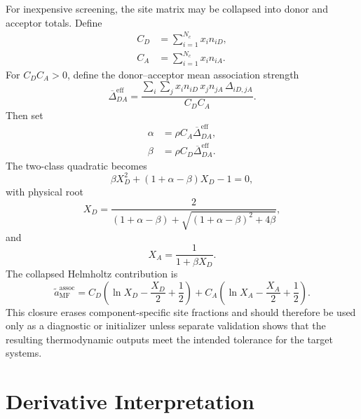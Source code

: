 \documentclass[12pt,letterpaper]{article}
\newcommand{\assoc}{\mathrm{assoc}}
\newcommand{\eff}{\mathrm{eff}}
\begin{document}
For inexpensive screening, the site matrix may be collapsed into donor and
acceptor totals. Define
\begin{align}
  C_D &= \sum_{i=1}^{N_c} x_i n_{iD}, \label{eq:total_donor_sites}\\
  C_A &= \sum_{i=1}^{N_c} x_i n_{iA}. \label{eq:total_acceptor_sites}
\end{align}
For \(C_D C_A>0\), define the donor--acceptor mean association strength
\begin{equation}
  \overline{\Delta}_{DA}^{\eff}
  =
  \frac{
    \sum_i\sum_j x_i n_{iD}\,x_j n_{jA}\,\Delta_{iD,jA}
  }{
    C_D C_A
  }.
  \label{eq:mean_field_delta}
\end{equation}
Then set
\begin{align}
  \alpha &= \rho C_A \overline{\Delta}_{DA}^{\eff},
  \label{eq:mean_field_alpha}\\
  \beta &= \rho C_D \overline{\Delta}_{DA}^{\eff}.
  \label{eq:mean_field_beta}
\end{align}
The two-class quadratic becomes
\begin{equation}
  \beta X_D^2 + (1+\alpha-\beta)X_D - 1 = 0,
  \label{eq:mean_field_quadratic}
\end{equation}
with physical root
\begin{equation}
  X_D =
  \frac{2}{
    (1+\alpha-\beta)+\sqrt{(1+\alpha-\beta)^2+4\beta}
  },
  \label{eq:mean_field_xd}
\end{equation}
and
\begin{equation}
  X_A = \frac{1}{1+\beta X_D}.
  \label{eq:mean_field_xa}
\end{equation}
The collapsed Helmholtz contribution is
\begin{equation}
  \widetilde{a}^{\assoc}_{\mathrm{MF}}
  =
  C_D\left(\ln X_D-\frac{X_D}{2}+\frac{1}{2}\right)
  +
  C_A\left(\ln X_A-\frac{X_A}{2}+\frac{1}{2}\right).
  \label{eq:mean_field_helmholtz}
\end{equation}
This closure erases component-specific site fractions and should therefore be
used only as a diagnostic or initializer unless separate validation shows that
the resulting thermodynamic outputs meet the intended tolerance for the target
systems.

\section{Derivative Interpretation}
\label{sec:derivative-interpretation}
\end{document}
